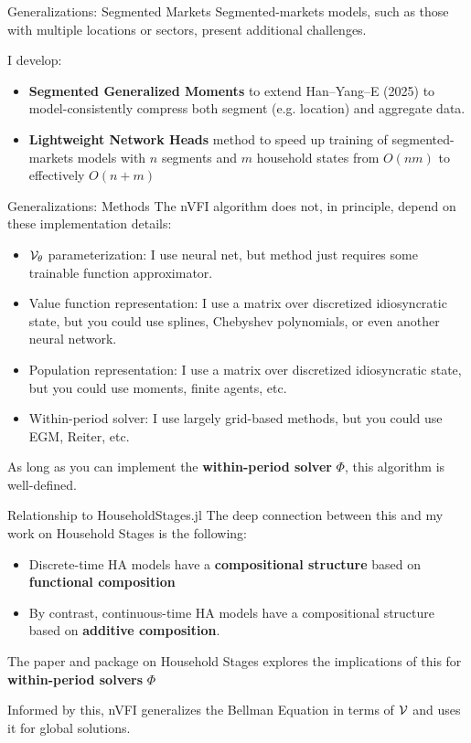 \documentclass[10pt,aspectratio=169]{beamer}
\begin{document}
\begin{frame}{Generalizations: Segmented Markets}
  Segmented-markets models, such as those with multiple locations or sectors, present additional challenges.

  I develop:
  \begin{itemize}
    \item \textbf{Segmented Generalized Moments} to extend Han--Yang--E (2025) to model-consistently compress both segment (e.g. location) and aggregate data.
    \item \textbf{Lightweight Network Heads} method to speed up training of segmented-markets models with $n$ segments and $m$ household states from $O(nm)$ to effectively $O(n+m)$
  \end{itemize}
\end{frame}

\begin{frame}{Generalizations: Methods}
  The nVFI algorithm does not, in principle, depend on these implementation details:
  \begin{itemize}
    \item $\mathcal{V}_\theta$ parameterization: I use neural net, but method just requires some trainable function approximator.
    \item Value function representation: I use a matrix over discretized idiosyncratic state, but you could use splines, Chebyshev polynomials, or even another neural network.
    \item Population representation: I use a matrix over discretized idiosyncratic state, but you could use moments, finite agents, etc.
    \item Within-period solver: I use largely grid-based methods, but you could use EGM, Reiter, etc.
  \end{itemize}
  As long as you can implement the \textbf{within-period solver} $\Phi$, this algorithm is well-defined.
\end{frame}

\begin{frame}{Relationship to HouseholdStages.jl}
  The deep connection between this and my work on Household Stages is the following:
  \begin{itemize}
    \item Discrete-time HA models have a \textbf{compositional structure} based on \textbf{functional composition}
    \item By contrast, continuous-time HA models have a compositional structure based on \textbf{additive composition}.
  \end{itemize}
  The paper and package on Household Stages explores the implications of this for \textbf{within-period solvers} $\Phi$

  Informed by this, nVFI generalizes the Bellman Equation in terms of $\mathcal{V}$ and uses it for global solutions.
\end{frame}
\end{document}
